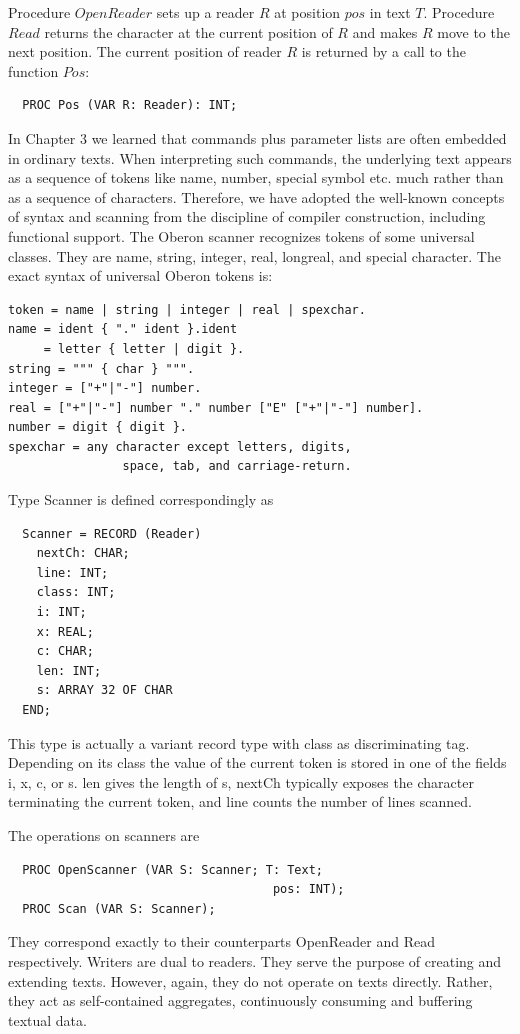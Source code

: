 Procedure $OpenReader$ sets up a reader $R$ at position $pos$ in text $T$. Procedure $Read$ returns the
character at the current position of $R$ and makes $R$ move to the next position.
The current position of reader $R$ is returned by a call to the function $Pos$:
\begin{verbatim}
  PROC Pos (VAR R: Reader): INT;
\end{verbatim}

In Chapter 3 we learned that commands plus parameter lists are often embedded in ordinary texts.
When interpreting such commands, the underlying text appears as a sequence of tokens like name,
number, special symbol etc. much rather than as a sequence of characters. Therefore, we have
adopted the well-known concepts of syntax and scanning from the discipline of compiler
construction, including functional support. The Oberon scanner recognizes tokens of some
universal classes. They are name, string, integer, real, longreal, and special character.
The exact syntax of universal Oberon tokens is:
\begin{verbatim}
token = name | string | integer | real | spexchar.
name = ident { "." ident }.ident
     = letter { letter | digit }.
string = """ { char } """.
integer = ["+"|"-"] number.
real = ["+"|"-"] number "." number ["E" ["+"|"-"] number].
number = digit { digit }.
spexchar = any character except letters, digits,
                space, tab, and carriage-return.
\end{verbatim}
Type Scanner is defined correspondingly as
\begin{verbatim}
  Scanner = RECORD (Reader)
    nextCh: CHAR;
    line: INT;
    class: INT;
    i: INT;
    x: REAL;
    c: CHAR;
    len: INT;
    s: ARRAY 32 OF CHAR
  END;
\end{verbatim}

This type is actually a variant record type with class as discriminating tag. Depending on its class
the value of the current token is stored in one of the fields i, x, c, or s. len gives the length of s,
nextCh typically exposes the character terminating the current token, and line counts the number of
lines scanned.

The operations on scanners are
\begin{verbatim}
  PROC OpenScanner (VAR S: Scanner; T: Text;
                                     pos: INT);
  PROC Scan (VAR S: Scanner);
\end{verbatim}

They correspond exactly to their counterparts OpenReader and Read respectively.
Writers are dual to readers. They serve the purpose of creating and extending texts. However,
again, they do not operate on texts directly. Rather, they act as self-contained aggregates,
continuously consuming and buffering textual data.

